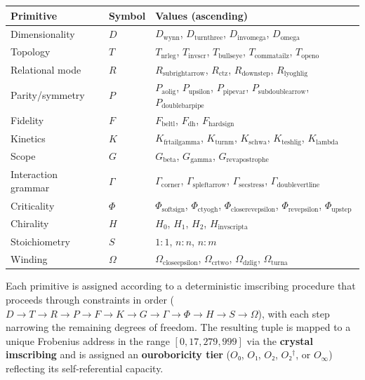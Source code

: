 \documentclass[12pt,a4paper]{article}
\begin{document}
\begin{table}[htbp]
\centering
\small
{}
\begin{tabularx}{\textwidth}{>{\centering\arraybackslash}X >{\centering\arraybackslash}X >{\centering\arraybackslash}X}
\toprule
\rowcolor{gray!25}\textbf{Primitive} & \textbf{Symbol} & \textbf{Values (ascending)} \\
\midrule
\rowcolors{1}{white}{gray!10}
Dimensionality & $D$ & $D_{\text{wynn}}$, $D_{\text{turnthree}}$, $D_{\text{invomega}}$, $D_{\text{omega}}$ \\
Topology & $T$ & $T_{\text{nrleg}}$, $T_{\text{invscr}}$, $T_{\text{bullseye}}$, $T_{\text{commatailz}}$, $T_{\text{openo}}$ \\
Relational mode & $R$ & $R_{\text{subrightarrow}}$, $R_{\text{ctz}}$, $R_{\text{downstep}}$, $R_{\text{lyoghlig}}$ \\
Parity/symmetry & $P$ & $P_{\text{aolig}}$, $P_{\text{upsilon}}$, $P_{\text{pipevar}}$, $P_{\text{subdoublearrow}}$, $P_{\text{doublebarpipe}}$ \\
Fidelity & $F$ & $F_{\text{beltl}}$, $F_{\text{dh}}$, $F_{\text{hardsign}}$ \\
Kinetics & $K$ & $K_{\text{frtailgamma}}$, $K_{\text{turnm}}$, $K_{\text{schwa}}$, $K_{\text{teshlig}}$, $K_{\text{lambda}}$ \\
Scope & $G$ & $G_{\text{beta}}$, $G_{\text{gamma}}$, $G_{\text{revapostrophe}}$ \\
Interaction grammar & $\Gamma$ & $\Gamma_{\text{corner}}$, $\Gamma_{\text{spleftarrow}}$, $\Gamma_{\text{secstress}}$, $\Gamma_{\text{doublevertline}}$ \\
Criticality & $\Phi$ & $\Phi_{\text{softsign}}$, $\Phi_{\text{ctyogh}}$, $\Phi_{\text{closerevepsilon}}$, $\Phi_{\text{revepsilon}}$, $\Phi_{\text{upstep}}$ \\
Chirality & $H$ & $H_0$, $H_1$, $H_2$, $H_{\text{invscripta}}$ \\
Stoichiometry & $S$ & $1{:}1$, $n{:}n$, $n{:}m$ \\
Winding & $\Omega$ & $\Omega_{\text{closeepsilon}}$, $\Omega_{\text{crtwo}}$, $\Omega_{\text{dzlig}}$, $\Omega_{\text{turna}}$ \\
\bottomrule
\end{tabularx}
\end{table}

Each primitive is assigned according to a deterministic imscribing procedure that proceeds through constraints in order ($D \to T \to R \to P \to F \to K \to G \to \Gamma \to \Phi \to H \to S \to \Omega$), with each step narrowing the remaining degrees of freedom. The resulting tuple is mapped to a unique Frobenius address in the range $[0, 17{,}279{,}999]$ via the \textbf{crystal imscribing} and is assigned an \textbf{ouroboricity tier} ($O₀$, $O₁$, $O₂$, $O₂^\dagger$, or $O_{\infty}$) reflecting its self-referential capacity.
\end{document}
